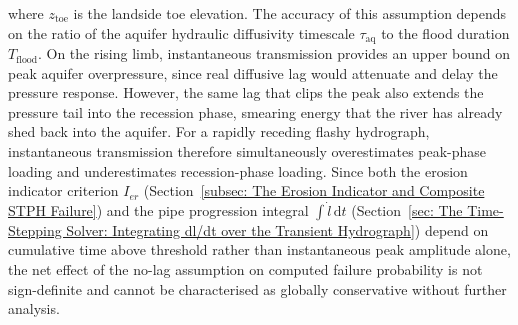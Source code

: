 where $z_\mathrm{toe}$ is the landside toe elevation. The accuracy of this assumption
depends on the ratio of the aquifer hydraulic diffusivity timescale $\tau_\mathrm{aq}$
to the flood duration $T_\mathrm{flood}$. On the rising limb, instantaneous transmission
provides an upper bound on peak aquifer overpressure, since real diffusive lag would
attenuate and delay the pressure response. However, the same lag that clips the peak
also extends the pressure tail into the recession phase, smearing energy that the river
has already shed back into the aquifer. For a rapidly receding flashy hydrograph,
instantaneous transmission therefore simultaneously overestimates peak-phase loading
and underestimates recession-phase loading. Since both the erosion indicator criterion
$I_{er}$ (Section~\ref{subsec: The Erosion Indicator and Composite STPH Failure}) and the pipe progression integral $\int \dot{l}\,\mathrm{d}t$
(Section~\ref{sec: The Time-Stepping Solver: Integrating dl/dt over the Transient Hydrograph}) depend on cumulative time above threshold rather than instantaneous
peak amplitude alone, the net effect of the no-lag assumption on computed failure
probability is not sign-definite and cannot be characterised as globally conservative
without further analysis.

